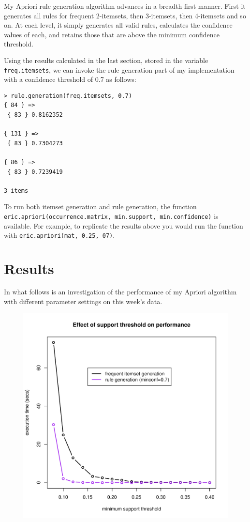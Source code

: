 \documentclass[a4paper,12pt]{article}
\begin{document}
My Apriori rule generation algorithm advances in a breadth-first manner. First
it generates all rules for frequent 2-itemsets, then 3-itemsets, then
4-itemsets and so on. At each level, it simply generates all valid rules,
calculates the confidence values of each, and retains those that are above the
minimum confidence threshold.

Using the results calculated in the last section, stored in the variable
\texttt{freq.itemsets}, we can invoke the rule generation part of my
implementation with a confidence threshold of 0.7 as follows:
\begin{verbatim}
> rule.generation(freq.itemsets, 0.7)
{ 84 } =>
 { 83 } 0.8162352 

{ 131 } =>
 { 83 } 0.7304273 

{ 86 } =>
 { 83 } 0.7239419 

3 items
\end{verbatim}

To run both itemset generation and rule generation, the function \linebreak
\texttt{eric.apriori(occurrence.matrix, min.support, min.confidence)} is
available. For example, to replicate the results above you would run the
function with \texttt{eric.apriori(mat, 0.25, 07)}.

\section{Results}
In what follows is an investigation of the performance of my Apriori
algorithm with different parameter settings on this week's data.

\begin{figure}[H]
  \centering
  \includegraphics[scale=0.80]{plot1.pdf}
\end{figure}
\end{document}
